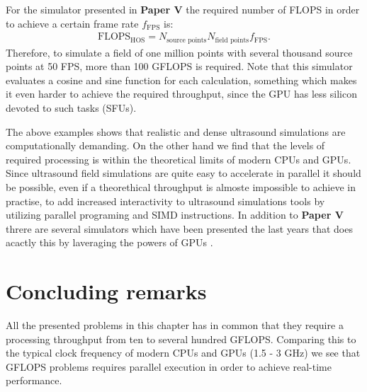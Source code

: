 For the simulator presented in \textbf{Paper V} the required number of FLOPS in order to achieve a certain frame rate $f_{\text{FPS}}$ is:
\begin{align}
\text{FLOPS}_{\text{HOS}} = N_{\text{source points}}N_{\text{field points}}f_{\text{FPS}}.
\end{align}
Therefore, to simulate a field of one million points with several thousand source points at 50 FPS, more than 100 GFLOPS is required. Note that this simulator evaluates a cosine and sine function for each calculation, something which makes it even harder to achieve the required throughput, since the GPU has less silicon devoted to such tasks (SFUs).

The above examples shows that realistic and dense ultrasound simulations are computationally demanding. On the other hand we find that the levels of required processing is within the theoretical limits of modern CPUs and GPUs. Since ultrasound field simulations are quite easy to accelerate in parallel it should be possible, even if a theorethical throughput is almoste impossible to achieve in practise, to add increased interactivity to ultrasound simulations tools by utilizing parallel programing and SIMD instructions. In addition to \textbf{Paper V} threre are several simulators which have been presented the last years that does acactly this by laveraging the powers of GPUs \cite{Gjerald2012, Reichl2009, Hlawitschka2011}.

\section{Concluding remarks}
All the presented problems in this chapter has in common that they require a processing throughput from ten to several hundred GFLOPS. Comparing this to the typical clock frequency of modern CPUs and GPUs (1.5 - 3 GHz) we see that GFLOPS problems requires parallel execution in order to achieve real-time performance.		

\endinput
